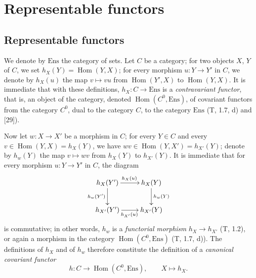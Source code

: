 \section{Representable functors}
\label{section:0.8}

\setcounter{subsection}{0}
\subsection{Representable functors}
\label{subsection:0.8.1}

\begin{env}[8.1.1]
\label{0.8.1.1}
We denote by $\mathrm{Ens}$ the category of sets. Let $C$ be a
category; for two objects $X$, $Y$ of $C$, we set
$h_X(Y)=\operatorname{Hom}(Y,X)$; for every morphism $u:Y\to Y'$ in $C$,
we denote by $h_X(u)$ the map $v\mapsto vu$ from
$\operatorname{Hom}(Y',X)$ to $\operatorname{Hom}(Y,X)$. It is immediate
that with these definitions, $h_X:C\to\mathrm{Ens}$ is a \emph{contravariant
functor}, that is, an object of the category, denoted
$\operatorname{Hom}(C^0,\mathrm{Ens})$, of covariant functors from the
category $C^0$, dual to the category $C$, to the category
$\mathrm{Ens}$ (T, 1.7, d) and [29]).
\end{env}

\begin{env}[8.1.2]
\label{0.8.1.2}
Now let $w:X\to X'$ be a morphism in $C$; for every $Y\in C$ and
every $v\in\operatorname{Hom}(Y,X)=h_X(Y)$, we have
$wv\in\operatorname{Hom}(Y,X')=h_{X'}(Y)$; denote by $h_w(Y)$
the map $v\mapsto wv$ from $h_X(Y)$ to $h_{X'}(Y)$. It is immediate
that for every morphism $u:Y\to Y'$ in $C$, the diagram
\[
  \xymatrix{
    h_X(Y')\ar[r]^{h_X(u)}\ar[d]_{h_w(Y')} &
    h_X(Y)\ar[d]^{h_w(Y)}\\
    h_{X'}(Y')\ar[r]_{h_{X'}(u)} &
    h_{X'}(Y)
  }
\]
is commutative; in other words, $h_w$ is a \emph{functorial morphism}
$h_X\to h_{X'}$ (T, 1.2), or again a morphism in the category
$\operatorname{Hom}(C^0,\mathrm{Ens})$ (T, 1.7, d)). The definitions of
$h_X$ and of $h_w$ therefore constitute the definition of a \emph{canonical
covariant functor}
\[
  h:C\to\operatorname{Hom}(C^0,\mathrm{Ens}),\qquad X\mapsto h_X.
  \tag{8.1.2.1}\label{0.8.1.2.1}
\]
\end{env}

